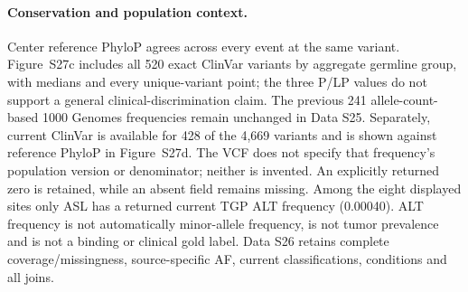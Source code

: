 \paragraph{Conservation and population context.} Center reference PhyloP agrees across every event at the same variant. Figure~S27c includes all 520 exact ClinVar variants by aggregate germline group, with medians and every unique-variant point; the three P/LP values do not support a general clinical-discrimination claim. The previous 241 allele-count-based 1000 Genomes frequencies remain unchanged in Data S25. Separately, current ClinVar  is available for 428 of the 4,669 variants and is shown against reference PhyloP in Figure~S27d. The VCF does not specify that frequency's population version or denominator; neither is invented. An explicitly returned zero is retained, while an absent field remains missing. Among the eight displayed sites only ASL has a returned current TGP ALT frequency (0.00040). ALT frequency is not automatically minor-allele frequency, is not tumor prevalence and is not a binding or clinical gold label. Data S26 retains complete coverage/missingness, source-specific AF, current classifications, conditions and all joins.
